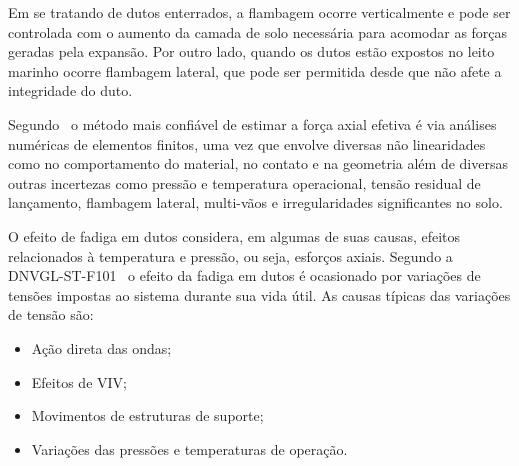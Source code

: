 Em se tratando de dutos enterrados, a flambagem ocorre verticalmente e pode ser controlada com o aumento da camada de solo necessária para acomodar as forças geradas pela expansão. Por outro lado, quando os dutos estão expostos no leito marinho ocorre flambagem lateral, que pode ser permitida desde que não afete a integridade do duto.

Segundo~\citet{Fyrileiv2005a} o método mais confiável de estimar a força axial efetiva é via análises numéricas de elementos finitos, uma vez que envolve diversas não linearidades como no comportamento do material, no contato e na geometria além de diversas outras incertezas como pressão e temperatura operacional, tensão residual de lançamento, flambagem lateral, multi-vãos e irregularidades significantes no solo.

O efeito de fadiga em dutos considera, em algumas de suas causas, efeitos relacionados à temperatura e pressão, ou seja, esforços axiais. Segundo a \mbox{DNVGL-ST-F101}~\cite{DNVF101} o efeito da fadiga em dutos é ocasionado por variações de tensões impostas ao sistema durante sua vida útil. As causas típicas das variações de tensão são:
	\begin{itemize}
		\item Ação direta das ondas;
		\item Efeitos de VIV;
		\item Movimentos de estruturas de suporte;
		\item Variações das pressões e temperaturas de operação.
	\end{itemize}








